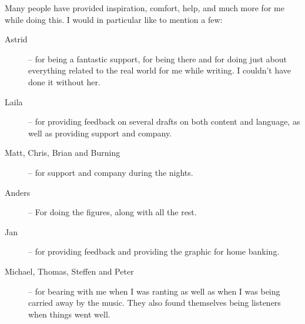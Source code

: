 Many people have provided inspiration, comfort, help, and much more
for me while doing this.  I would in particular like to mention a few:

\begin{description}
\item[Astrid] -- for being a fantastic support, for being there and
  for doing just about everything related to the real world for me
  while writing.  I couldn't have done it without her.
  
\item[Laila] -- for providing feedback on several drafts on both
  content and language, as well as
  providing support and company.

\item[Matt, Chris, Brian and Burning] -- for support and
  company during the nights.
  
\item[Anders] -- For doing the figures, along with all the rest.
  
\item[Jan] -- for providing feedback and providing the graphic for
  home banking.

\item[Michael, Thomas, Steffen and Peter] -- for bearing with me when
  I was ranting as well as when I was being carried away by the music.
   They also found themselves being listeners when things went well.  


\end{description}



